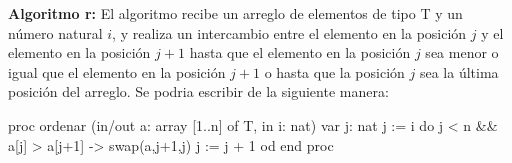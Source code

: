 \documentclass{article}
\begin{document}
\textbf{Algoritmo r:} El algoritmo recibe un arreglo de elementos de tipo T y un número natural $i$, y realiza un intercambio entre el elemento en la posición $j$ y el elemento en la posición $j+1$ hasta que el elemento en la posición $j$ sea menor o igual que el elemento en la posición $j+1$ o hasta que la posición $j$ sea la última posición del arreglo.
Se podria escribir de la siguiente manera:
\begin{pascallike}
proc ordenar (in/out a: array [1..n] of T, in i: nat)
  var j: nat
  j := i
  do j < n && a[j] > a[j+1] ->
    swap(a,j+1,j)
    j := j + 1
  od
end proc
\end{pascallike}
\end{document}
